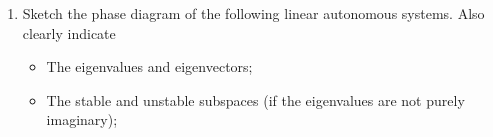 \documentclass[../psets.tex]{subfiles}
\begin{document}
\begin{enumerate}
\begin{proof}
        From HW3, the given driven harmonic oscillator equation is solved by
        \begin{align*}
            x(t) &= x(0)\cos\omega_0t+x'(0)\frac{\sin\omega_0t}{\omega_0}+\int_0^t\frac{\sin\omega_0(t-\tau)}{\omega_0}(H_0\cos\omega\tau)\dd\tau\\
            &= x(0)\cos\omega_0t+x'(0)\frac{\sin\omega_0t}{\omega_0}+\frac{H_0}{\omega^2-\omega_0^2}(\cos\omega_0t-\cos\omega t)
        \end{align*}
        We have that $|x(0)\cos\omega_0t|\leq|x(0)|$ and $|x'(0)\sin\omega_0t|\leq|x'(0)|$ and $|x'(0)|<\varepsilon\omega_0$ and $|x(0)|<\varepsilon H_0/|\omega^2-\omega_0^2|$. Thus
        \begin{align*}
            \left| x(0)\cos\omega_0t+x'(0)\frac{\sin\omega_0t}{\omega_0} \right| &\leq |x(0)\cos\omega_0t|+\frac{1}{\omega_0}|x'(0)\sin\omega_0t|\\
            &\leq |x(0)|+\frac{|x'(0)|}{\omega_0}\\
            &< |x(0)|+\varepsilon\\
            &< \frac{\varepsilon H_0}{|\omega^2-\omega_0^2|}+\varepsilon\\
            &= \varepsilon\left( \frac{H_0}{|\omega^2-\omega_0^2|}+1 \right)
        \end{align*}
        We also have that
        \begin{align*}
            \left| \frac{H_0}{\omega^2-\omega_0^2}(\cos\omega_0t-\cos\omega t) \right| &= \frac{H_0}{|\omega^2-\omega_0^2|}\cdot|\cos\omega_0t-\cos\omega t|\\
            &\leq \frac{H_0}{|\omega^2-\omega_0^2|}\cdot 2
        \end{align*}
        It follows that
        \begin{align*}
            |x(t)| &< \frac{2H_0}{|\omega^2-\omega_0^2|}+\frac{\varepsilon H_0}{|\omega^2-\omega_0^2|}+\varepsilon\\
            &= (2+\varepsilon)\cdot\frac{H_0}{|\omega^2-\omega_0^2|}+\varepsilon
        \end{align*}
    \end{proof}
    \item Sketch the phase diagram of the following linear autonomous systems. Also clearly indicate
    \begin{itemize}
        \item The eigenvalues and eigenvectors;
        \item The stable and unstable subspaces (if the eigenvalues are not purely imaginary);

\end{itemize}
\end{enumerate}
\end{document}
